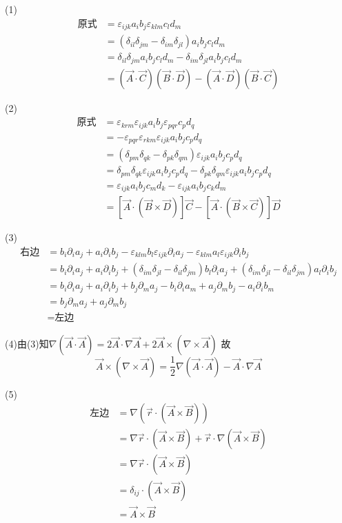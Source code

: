 \documentclass{phyasgn}
\newcommand{\pt}{\partial}
\begin{document}
\begin{pf}[1]
    (1)\begin{align*}
        \text{原式}&=\varepsilon_{ijk}a_ib_j\varepsilon_{klm}c_ld_m\\
        &=(\delta_{il}\delta_{jm}-\delta_{im}\delta_{jl})a_ib_jc_ld_m\\
        &=\delta_{il}\delta_{jm}a_ib_jc_ld_m-\delta_{im}\delta_{jl}a_ib_jc_ld_m\\
        &=(\vec{A}\cdot\vec{C})(\vec{B}\cdot\vec{D})-(\vec{A}\cdot\vec{D})(\vec{B}\cdot\vec{C})
    \end{align*}

(2)\begin{align*}
    \text{原式}&=\varepsilon_{krm}\varepsilon_{ijk}a_ib_j\varepsilon_{pqr}c_pd_q\\
    &=-\varepsilon_{pqr}\varepsilon_{rkm}\varepsilon_{ijk}a_ib_jc_pd_q\\
    &=(\delta_{pm}\delta_{qk}-\delta_{pk}\delta_{qm})\varepsilon_{ijk}a_ib_jc_pd_q\\
    &=\delta_{pm}\delta_{qk}\varepsilon_{ijk}a_ib_jc_pd_q-\delta_{pk}\delta_{qm}\varepsilon_{ijk}a_ib_jc_pd_q\\
    &=\varepsilon_{ijk}a_ib_jc_md_k-\varepsilon_{ijk}a_ib_jc_kd_m\\
    &=[\vec{A}\cdot(\vec{B}\times\vec{D})]\vec{C}-[\vec{A}\cdot(\vec{B}\times\vec{C})]\vec{D}
\end{align*}

(3)\begin{align*}
    \text{右边}&=b_i\pt_ia_j+a_i\pt_ib_j-\varepsilon_{klm}b_l\varepsilon_{ijk}\pt_ia_j-\varepsilon_{klm}a_l\varepsilon_{ijk}\pt_ib_j\\
    &=b_i\pt_ia_j+a_i\pt_ib_j+(\delta_{im}\delta_{jl}-\delta_{il}\delta_{jm})b_l\pt_ia_j+(\delta_{im}\delta_{jl}-\delta_{il}\delta_{jm})a_l\pt_ib_j\\
    &=b_i\pt_ia_j+a_i\pt_ib_j+b_j\pt_ma_j-b_i\pt_ia_m+a_j\pt_mb_j-a_i\pt_ib_m\\
    &=b_j\pt_ma_j+a_j\pt_mb_j\\
    &=\text{左边}
\end{align*}

(4)由(3)知$\nabla(\vec{A}\cdot\vec{A})=2\vec{A}\cdot\nabla\vec{A}+2\vec{A}\times(\nabla\times\vec{A})$
故
$$\vec{A}\times(\nabla\times\vec{A})=\frac{1}{2}\nabla(\vec{A}\cdot\vec{A})-\vec{A}\cdot\nabla\vec{A}$$

(5)\begin{align*}
    \text{左边}&=\nabla(\vec{r}\cdot(\vec{A}\times\vec{B}))\\
    &=\nabla\vec{r}\cdot(\vec{A}\times\vec{B})+\vec{r}\cdot\nabla(\vec{A}\times\vec{B})\\
    &=\nabla\vec{r}\cdot(\vec{A}\times\vec{B})\\
    &=\delta_{ij}\cdot(\vec{A}\times\vec{B})\\
    &=\vec{A}\times\vec{B}
\end{align*}


\end{pf}
\end{document}
